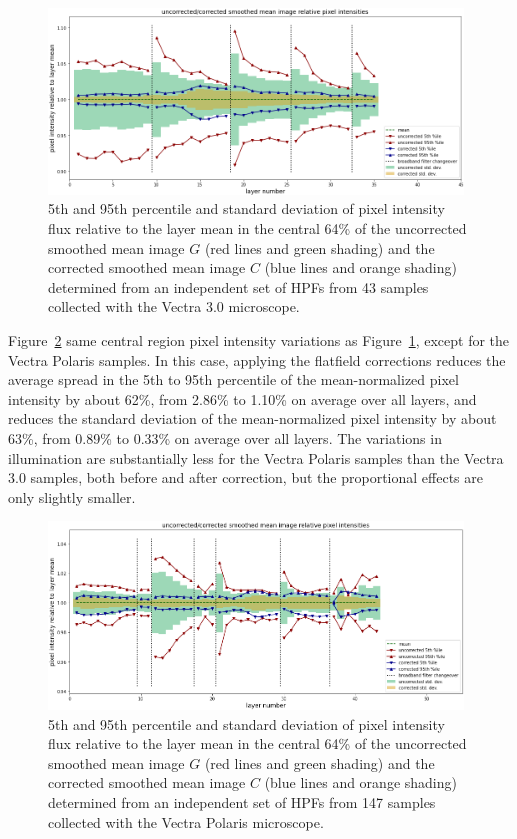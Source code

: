 \documentclass[letterpaper,11pt]{article}
\newcommand{\reffig}[1]{Figure~\ref{#1}}
\begin{document}
\begin{figure}[!ht]
\centering
\includegraphics[width=0.98\textwidth]{images/results/illumination_variation_reduction_vectra}
\caption{\footnotesize 5th and 95th percentile and standard deviation of pixel intensity flux relative to the layer mean in the central 64\% of the uncorrected smoothed mean image $G$ (red lines and green shading) and the corrected smoothed mean image $C$ (blue lines and orange shading) determined from an independent set of HPFs from 43 samples collected with the Vectra 3.0 microscope.}
\label{fig:illumination_variation_reduction_vectra}
\end{figure} 

\reffig{fig:illumination_variation_reduction_polaris} same central region pixel intensity variations as \reffig{fig:illumination_variation_reduction_vectra}, except for the Vectra Polaris samples. In this case, applying the flatfield corrections reduces the average spread in the 5th to 95th percentile of the mean-normalized pixel intensity by about 62\%, from 2.86\% to 1.10\% on average over all layers, and reduces the standard deviation of the mean-normalized pixel intensity by about 63\%, from 0.89\% to 0.33\% on average over all layers. The variations in illumination are substantially less for the Vectra Polaris samples than the Vectra 3.0 samples, both before and after correction, but the proportional effects are only slightly smaller.

\begin{figure}[!ht]
\centering
\includegraphics[width=0.98\textwidth]{images/results/illumination_variation_reduction_polaris}
\caption{\footnotesize 5th and 95th percentile and standard deviation of pixel intensity flux relative to the layer mean in the central 64\% of the uncorrected smoothed mean image $G$ (red lines and green shading) and the corrected smoothed mean image $C$ (blue lines and orange shading) determined from an independent set of HPFs from 147 samples collected with the Vectra Polaris microscope.}
\label{fig:illumination_variation_reduction_polaris}
\end{figure} 
\end{document}
